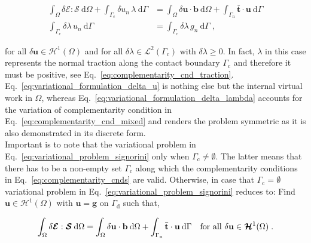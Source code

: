 \documentclass[10pt,a4paper]{article}
\begin{document}
\begin{subequations}
	\begin{alignat}{1}
		\int_{\Omega} \delta \boldsymbol{\mathcal{E}} : \boldsymbol{\mathcal{S}} \: \text{d} \Omega + \int_{\Gamma_{\text{c}}} \delta u_n \, \lambda \: \text{d} \Gamma &= \int_{\Omega} \delta \mathbf{u} \cdot \mathbf{b} \: \text{d} \Omega + \int_{\Gamma_{\text{n}}} \bar{\mathbf{t}} \cdot \mathbf{u} \: \text{d} \Gamma \label{eq:variational_formulation_delta_u} \\
		\int_{\Gamma_{\text{c}}} \delta \lambda \, u_n \: \text{d} \Gamma &= \int_{\Gamma_{\text{c}}} \delta \lambda \, g_n \: \text{d} \Gamma \;, \label{eq:variational_formulation_delta_lambda}
	\end{alignat}
	\label{eq:variational_problem_signorini}
\end{subequations}

for all $\delta \mathbf{u} \in \boldsymbol{\mathcal{H}}^1 (\Omega)$ and for all $\delta \lambda \in \mathcal{L}^2(\Gamma_{\text{c}})$ with $\delta \lambda \ge 0$. In fact, $\lambda$ in this case represents the normal traction along the contact boundary $\Gamma_{\text{c}}$ and therefore it must be positive, see Eq.~\eqref{eq:complementarity_cnd_traction}. Eq.~\eqref{eq:variational_formulation_delta_u} is nothing else but the internal virtual work in $\Omega$, whereas Eq.~\eqref{eq:variational_formulation_delta_lambda} accounts for the variation of complementarity condition in Eq.~\eqref{eq:complementarity_cnd_mixed} and renders the problem symmetric as it is also demonstrated in its discrete form.\\

Important is to note that the variational problem in Eq.~\eqref{eq:variational_problem_signorini} only when $\Gamma_{\text{c}} \neq \emptyset$. The latter means that there has to be a non-empty set $\Gamma_{\text{c}}$ along which the complementarity conditions in Eq.~\eqref{eq:complementarity_cnds} are valid. Otherwise, in case that $\Gamma_{\text{c}} = \emptyset$ variational problem in Eq.~\eqref{eq:variational_problem_signorini} reduces to: Find $\mathbf{u} \in \boldsymbol{\mathcal{H}}^1 (\Omega)$ with $\mathbf{u} = \mathbf{g}$ on $\Gamma_{\text{d}}$ such that,

\begin{equation}
	\int_{\Omega} \delta \boldsymbol{\mathcal{E}} : \boldsymbol{\mathcal{S}} \: \text{d} \Omega = \int_{\Omega} \delta \mathbf{u} \cdot \mathbf{b} \: \text{d} \Omega + \int_{\Gamma_{\text{n}}} \bar{\mathbf{t}} \cdot \mathbf{u} \: \text{d} \Gamma \quad \text{for all } \delta \mathbf{u} \in \boldsymbol{\mathcal{H}}^1 (\Omega) \;. \label{eq:variational_formulation_structural_mechanics} \\
\end{equation} 
\end{document}
